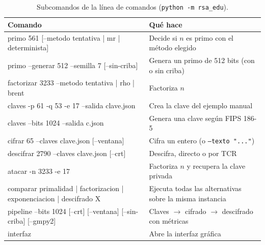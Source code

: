 \begin{table}[H]
\centering\small
\caption{Subcomandos de la línea de comandos (\texttt{python -m rsa\_edu}).}
\label{tab:cli}
\begin{tabularx}{\linewidth}{@{}>{\ttfamily\footnotesize}R{7.8cm} Y@{}}
\toprule
\textrm{\textbf{Comando}} & \textbf{Qué hace}\\
\midrule
primo 561 [--metodo tentativa | mr | determinista] & Decide si $n$ es primo con el método elegido\\
primo --generar 512 --semilla 7 [--sin-criba] & Genera un primo de 512 bits (con o sin criba)\\
factorizar 3233 --metodo tentativa | rho | brent & Factoriza $n$\\
claves -p 61 -q 53 -e 17 --salida clave.json & Crea la clave del ejemplo manual\\
claves --bits 1024 --salida c.json & Genera una clave según FIPS 186-5\\
cifrar 65 --claves clave.json [--ventana] & Cifra un entero (o \texttt{--texto "..."})\\
descifrar 2790 --claves clave.json [--crt] & Descifra, directo o por TCR\\
atacar -n 3233 -e 17 & Factoriza $n$ y recupera la clave privada\\
comparar primalidad | factorizacion | exponenciacion | descifrado X & Ejecuta todas las alternativas sobre la misma instancia\\
pipeline --bits 1024 [--crt] [--ventana] [--sin-criba] [--gmpy2] & Claves $\rightarrow$ cifrado $\rightarrow$ descifrado con métricas\\
interfaz & Abre la interfaz gráfica\\
\bottomrule
\end{tabularx}
\end{table}

